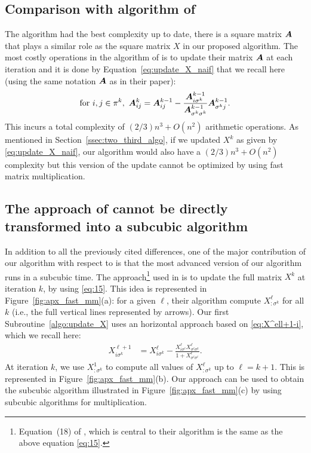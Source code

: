 \documentclass[acmsmall,screen,anonymous]{acmart}
\begin{document}
\subsection{Comparison with  algorithm of \cite{nino2020fast}} The algorithm \cite{nino2020fast}  had the best complexity up to date, there is a square matrix $\boldsymbol{A}$ that plays a similar role as the square matrix $X$ in our proposed algorithm. The most costly operations in the algorithm of \cite{nino2020fast} is to update their matrix $\boldsymbol{A}$ at each iteration and it is done by Equation~\eqref{eq:update_X_naif} that we recall here (using the same notation $\boldsymbol{A}$ as in their paper):
\begin{align}
    \label{eq:15}
    \text{for } i,j\in\pi^k,\ \boldsymbol{A}^k_{ij}= \boldsymbol{A}^{k-1}_{ij} -\frac{\boldsymbol{A}^{k-1}_{i\sigma^k}}{\boldsymbol{A}^{k-1}_{\sigma^k\sigma^k}}\boldsymbol{A}^{k-1}_{\sigma^kj}.
\end{align}
This incurs a total complexity of $(2/3)n^3+O(n^2)$ arithmetic operations.
As mentioned in Section~\ref{ssec:two_third_algo}, if we updated $X^k$ as given by \eqref{eq:update_X_naif}, our algorithm would also have a $(2/3)n^3+O(n^2)$ complexity but this version of the update cannot be optimized by using  fast matrix multiplication.

\subsection{The approach of \cite{akbarzadeh2020conditions,nino2020fast} cannot be directly transformed into a subcubic algorithm}
\label{apx:eq_15}

In addition to all the previously cited differences, one of the major contribution of our algorithm with respect to \cite{akbarzadeh2020conditions,nino2020fast} is that the most advanced version of our algorithm runs in a subcubic time. The approach\footnote{Equation~(18) of \cite{akbarzadeh2020conditions}, which is central to their algorithm is the same as the above equation \eqref{eq:15}.} used  in \cite{akbarzadeh2020conditions,nino2020fast} is to update the full matrix $X^k$ at iteration $k$, by using \eqref{eq:15}.  This idea is represented in Figure~\ref{fig:apx_fast_mm}(a): for a given $\ell$, their algorithm compute $X^\ell_{\colon\sigma^k}$ for all $k$ (i.e., the full vertical lines represented by arrows).  Our first Subroutine~\ref{algo:update_X} uses an horizontal approach based on \eqref{eq:X^ell+1-i}, which we recall here:
\begin{align*}
    X^{\ell+1}_{i\sigma^k} &= X^{\ell}_{i\sigma^k} - \frac{X^{\ell}_{i\sigma^\ell} X^{\ell}_{{\sigma^\ell} \sigma^k}}{1+X^{\ell}_{{\sigma^\ell\sigma^\ell}}}.
\end{align*}
At iteration $k$, we use $X^{1}_{\colon \sigma^k}$ to compute all values of $X^\ell_{\colon\sigma^k}$ up to $\ell=k+1$.  This is represented in Figure~\ref{fig:apx_fast_mm}(b).  Our approach can be used to obtain the subcubic algorithm illustrated in Figure~\ref{fig:apx_fast_mm}(c) by using subcubic algorithms for multiplication.
\end{document}
